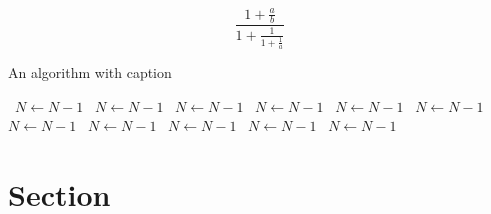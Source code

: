 \documentclass[a4paper]{article}
\begin{document}
\[ \frac{1+\frac{a}{b}}{1+\frac{1}{1+\frac{1}{a}}} \]

\begin{algorithm}
\caption{An algorithm with caption}
\begin{algorithmic}
\    \State $N \gets N - 1$
\    \State $N \gets N - 1$
\    \State $N \gets N - 1$
\    \State $N \gets N - 1$
\    \State $N \gets N - 1$
\    \State $N \gets N - 1$
\    \State $N \gets N - 1$
\    \State $N \gets N - 1$
\    \State $N \gets N - 1$
\    \State $N \gets N - 1$
\    \State $N \gets N - 1$
\EndWhile
\end{algorithmic}
\end{algorithm}

\section{Section}
\end{document}

